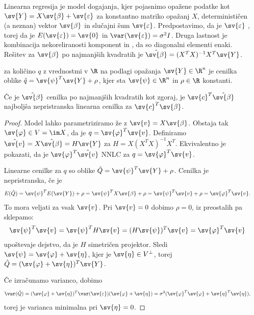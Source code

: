 
Linearna regresija je model dogajanja, kjer pojasnimo opažene podatke kot
$\sv{Y} = X \sv{\beta} + \sv{\varepsilon}$ za konstantno matriko opažanj $X$,
determinističen (a neznan) vektor $\sv{\beta}$ in slučajni šum
$\sv{\varepsilon}$.
Predpostavimo, da je $\sv{\varepsilon}$ , torej da je
$E(\sv{\varepsilon}) = \sv{0}$ in $\var(\sv{\varepsilon}) = \sigma^2 I$.
Druga lastnost je kombinacija nekoreliranosti komponent in
, da so diagonalni elementi enaki.
Rešitev za $\sv{\beta}$ po najmanjših kvadratih je $\hat{\sv{\beta}} = (X^T
X)^{-1} X^T \sv{Y}$.

\begin{definicija}
   za količino $q$ z vrednostmi v $\R$ na podlagi
  opažanja $\sv{Y} \in \R^n$ je cenilka oblike $\hat{q} = \sv{\psi}^T \sv{Y} +
  \rho$, kjer sta $\sv{\psi} \in \R^n$ in $\rho \in \R$ konstanti.
\end{definicija}

\begin{izrek}
  Če je $\hat{\sv{\beta}}$ cenilka po najmanjših kvadratih kot zgoraj, je
  $\sv{c}^T \hat{\sv{\beta}}$ najboljša nepristranska linearna cenilka za
  $\sv{c}^T \sv{\beta}$.
\end{izrek}

\begin{proof}
  Model lahko parametriziramo že z $\sv{v} = X \sv{\beta}$.
  Obstaja tak $\sv{\varphi} \in V = \im X$, da je $q = \sv{\varphi}^T \sv{v}$.
  Definiramo $\hat{\sv{v}} = X \hat{\sv{\beta}} = H \sv{Y}$ za $H = X (X^T
  X)^{-1} X^T$.
  Ekvivalentno je pokazati, da je $\sv{\varphi}^T \hat{\sv{v}}$ NNLC za $q =
  \sv{\varphi}^T \sv{v}$.

  Linearne cenilke za $q$ so oblike $\hat{Q} = \sv{\psi}^T \sv{Y} + \rho$.
  Cenilka je nepristranska, če je
  \[
	E(\hat{Q}) = \sv{\psi}^T E(\sv{Y}) + \rho
	= \sv{\psi}^T X \sv{\beta} + \rho = \sv{\psi}^T \sv{v} + \rho
	= \sv{\varphi}^T \sv{v}.
  \]
  To mora veljati za vsak $\sv{v}$.
  Pri $\sv{v} = 0$ dobimo $\rho = 0$, iz preostalih pa sklepamo:
  \[
	\sv{\psi}^T \sv{v}
	= \sv{\psi}^T H \sv{v}
	= (H \sv{\psi})^T \sv{v}
	= \sv{\varphi}^T \sv{v}
  \]
  upoštevaje dejstvo, da je $H$ simetričen projektor.
  Sledi $\sv{\psi} = \sv{\varphi} + \sv{\eta}$, kjer je $\sv{\eta} \in V^\bot$,
  torej $\hat{Q} = (\sv{\varphi} + \sv{\eta})^T \sv{Y}$.

  Če izračunamo varianco, dobimo
  \[
	\var(\hat{Q}) = (\sv{\varphi} + \sv{\eta})^T \var(\sv{\varepsilon})
	(\sv{\varphi} + \sv{\eta})
	= \sigma^2 (\sv{\varphi}^T \sv{\varphi} + \sv{\eta}^T \sv{\eta}),
  \]
  torej je varianca minimalna pri $\sv{\eta} = 0$.
\end{proof}

